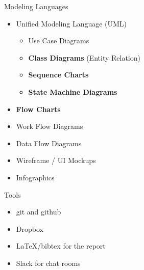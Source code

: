 \documentclass[hyperref={pdfpagelabels=false}, aspectratio=1610,handout]{beamer}
\begin{document}
\begin{frame}
\begin{block}{Modeling Languages}
 \begin{itemize}
  \item Unified Modeling Language (UML)
  \begin{itemize}
	\item Use Case Diagrams
  	\item \textbf{Class Diagrams} (Entity Relation)
	\item \textbf{Sequence Charts}
	\item \textbf{State Machine Diagrams}
  \end{itemize}
  \item \textbf{Flow Charts}
  \item Work Flow Diagrams
  \item Data Flow Diagrams
  \item Wireframe / UI Mockups
  \item Infographics
 \end{itemize}
\end{block}
\end{frame}

\begin{frame}
\begin{block}{Tools}
 \begin{itemize}
  \item git and github
  \item Dropbox
  \item LaTeX/bibtex for the report
  \item Slack for chat rooms
 \end{itemize}
\end{block}
\end{frame}
\end{document}
